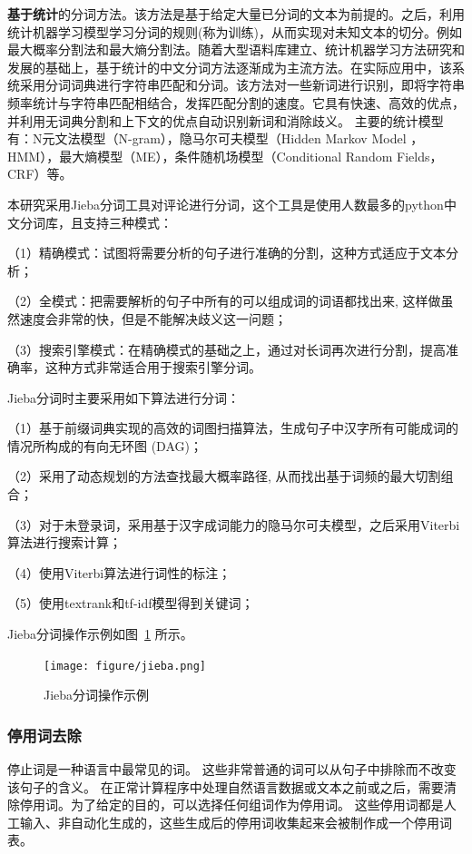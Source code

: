 \documentclass[cs4size,a4paper]{ctexart}
\numberwithin{equation}{section}
\numberwithin{table}{section}
\numberwithin{figure}{section}
\begin{document}
\textbf{基于统计}的分词方法。该方法是基于给定大量已分词的文本为前提的。之后，利用统计机器学习模型学习分词的规则(称为训练)，从而实现对未知文本的切分。例如最大概率分割法和最大熵分割法。随着大型语料库建立、统计机器学习方法研究和发展的基础上，基于统计的中文分词方法逐渐成为主流方法。在实际应用中，该系统采用分词词典进行字符串匹配和分词。该方法对一些新词进行识别，即将字符串频率统计与字符串匹配相结合，发挥匹配分割的速度。它具有快速、高效的优点，并利用无词典分割和上下文的优点自动识别新词和消除歧义。
主要的统计模型有：N元文法模型（N-gram），隐马尔可夫模型（Hidden Markov Model ，HMM），最大熵模型（ME），条件随机场模型（Conditional Random Fields，CRF）等。


本研究采用Jieba分词工具对评论进行分词，这个工具是使用人数最多的python中文分词库，且支持三种模式：

（1）精确模式：试图将需要分析的句子进行准确的分割，这种方式适应于文本分析；

（2）全模式：把需要解析的句子中所有的可以组成词的词语都找出来, 这样做虽然速度会非常的快，但是不能解决歧义这一问题；

（3）搜索引擎模式：在精确模式的基础之上，通过对长词再次进行分割，提高准确率，这种方式非常适合用于搜索引擎分词。

Jieba分词时主要采用如下算法进行分词：

（1）基于前缀词典实现的高效的词图扫描算法，生成句子中汉字所有可能成词的情况所构成的有向无环图 (DAG)；

（2）采用了动态规划的方法查找最大概率路径, 从而找出基于词频的最大切割组合；

（3）对于未登录词，采用基于汉字成词能力的隐马尔可夫模型，之后采用Viterbi算法进行搜索计算；

（4）使用Viterbi算法进行词性的标注；

（5）使用textrank和tf-idf模型得到关键词；

Jieba分词操作示例如图~\ref{fig:Jieba} 所示。
\begin{figure}
  \centering
  \texttt{[image: figure/jieba.png]}
\caption{Jieba分词操作示例}\label{fig:Jieba}
\end{figure}

\subsubsection{停用词去除}

停止词是一种语言中最常见的词。 这些非常普通的词可以从句子中排除而不改变该句子的含义。 在正常计算程序中处理自然语言数据或文本之前或之后，需要清除停用词。为了给定的目的，可以选择任何组词作为停用词。  这些停用词都是人工输入、非自动化生成的，这些生成后的停用词收集起来会被制作成一个停用词表。
\end{document}

